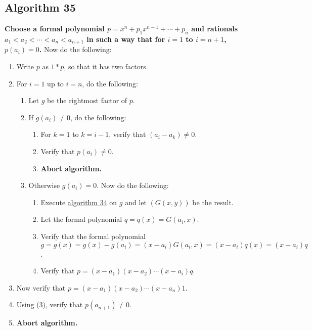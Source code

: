 \documentclass[twocolumn]{article}
\begin{document}
		\subsection{Algorithm 35}\label{sec:algorithm 35}
			\textbf{Choose a formal polynomial $p=x^n+p_1x^{n-1}+\cdots+p_n$ and rationals $a_1<a_2<\cdots<a_n<a_{n+1}$ in such a way that for $i=1$ to $i=n+1$, $p(a_i)=0$.} Now do the following:
			\begin{enumerate}
				\item Write $p$ as $1*p$, so that it has two factors.
				\item For $i=1$ up to $i=n$, do the following:
				\begin{enumerate}
					\item Let $g$ be the rightmost factor of $p$.
					\item If $g(a_i)\ne 0$, do the following:
					\begin{enumerate}
						\item For $k=1$ to $k=i-1$, verify that $(a_i-a_k)\ne 0$.
						\item Verify that $p(a_i)\ne 0$.
						\item \textbf{Abort algorithm.}
					\end{enumerate}
					\item Otherwise $g(a_i)=0$. Now do the following:
					\begin{enumerate}
						\item Execute \hyperref[sec:algorithm 34]{algorithm 34} on $g$ and let $(G(x,y))$ be the result.
						\item Let the formal polynomial $q=q(x)=G(a_i,x)$.
						\item Verify that the formal polynomial $g=g(x)=g(x)-g(a_i)=(x-a_i)G(a_i,x)=(x-a_i)q(x)=(x-a_i)q$.
						\item Verify that $p=(x-a_1)(x-a_2)\cdots(x-a_i)q$.
					\end{enumerate}
				\end{enumerate}
				\item Now verify that $p=(x-a_1)(x-a_2)\cdots(x-a_n)1$.
				\item Using (3), verify that $p(a_{n+1})\ne 0$.
				\item \textbf{Abort algorithm.}
			\end{enumerate}
\end{document}
